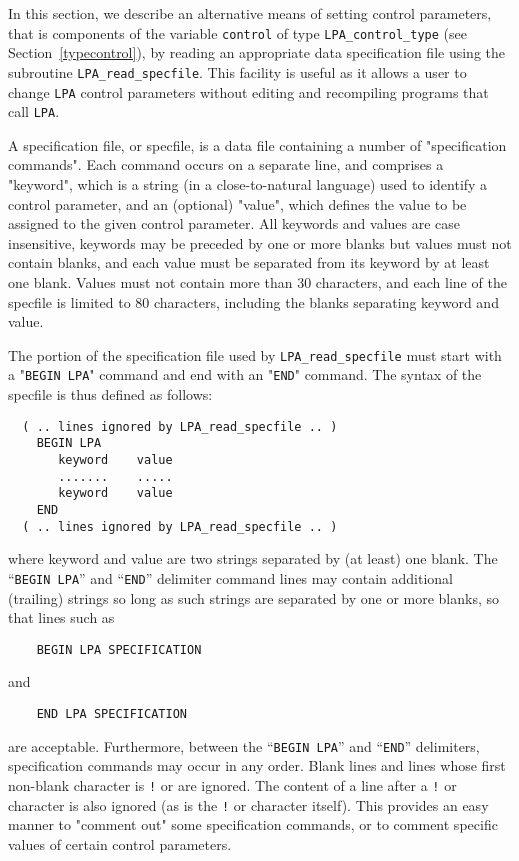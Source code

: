\documentclass{galahad}
\newcommand{\packagename}{LPA}
\begin{document}

\galfeatures
\noindent In this section, we describe an alternative means of setting
control parameters, that is components of the variable {\tt control} of type
{\tt \packagename\_control\_type}
(see Section~\ref{typecontrol}),
by reading an appropriate data specification file using the
subroutine {\tt \packagename\_read\_specfile}. This facility
is useful as it allows a user to change  {\tt \packagename} control parameters
without editing and recompiling programs that call {\tt \packagename}.

A specification file, or specfile, is a data file containing a number of
"specification commands". Each command occurs on a separate line,
and comprises a "keyword",
which is a string (in a close-to-natural language) used to identify a
control parameter, and
an (optional) "value", which defines the value to be assigned to the given
control parameter. All keywords and values are case insensitive,
keywords may be preceded by one or more blanks but
values must not contain blanks, and
each value must be separated from its keyword by at least one blank.
Values must not contain more than 30 characters, and
each line of the specfile is limited to 80 characters,
including the blanks separating keyword and value.



The portion of the specification file used by
{\tt \packagename\_read\_specfile}
must start
with a "{\tt BEGIN \packagename}" command and end with an
"{\tt END}" command.  The syntax of the specfile is thus defined as follows:
\begin{verbatim}
  ( .. lines ignored by LPA_read_specfile .. )
    BEGIN LPA
       keyword    value
       .......    .....
       keyword    value
    END
  ( .. lines ignored by LPA_read_specfile .. )
\end{verbatim}
where keyword and value are two strings separated by (at least) one blank.
The ``{\tt BEGIN \packagename}'' and ``{\tt END}'' delimiter command lines
may contain additional (trailing) strings so long as such strings are
separated by one or more blanks, so that lines such as
\begin{verbatim}
    BEGIN LPA SPECIFICATION
\end{verbatim}
and
\begin{verbatim}
    END LPA SPECIFICATION
\end{verbatim}
are acceptable. Furthermore,
between the
``{\tt BEGIN \packagename}'' and ``{\tt END}'' delimiters,
specification commands may occur in any order.  Blank lines and
lines whose first non-blank character is {\tt !} or {\tt *} are ignored.
The content
of a line after a {\tt !} or {\tt *} character is also
ignored (as is the {\tt !} or {\tt *}
character itself). This provides an easy manner to "comment out" some
specification commands, or to comment specific values
of certain control parameters.
\end{document}
